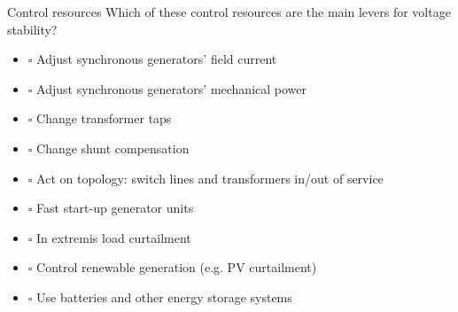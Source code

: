 \begin{frame}{Control resources}
    Which of these control resources are the main levers for voltage stability?
      \begin{itemize}
          \item $\square$ Adjust synchronous generators' field current %
          \item $\square$ Adjust synchronous generators' mechanical power 
          \item $\square$ Change transformer taps %
          \item $\square$ Change shunt compensation %
          \item $\square$ Act on topology: switch lines and transformers in/out of service %
          \item $\square$ Fast start-up generator units %
          \item $\square$ In extremis load curtailment %
          \item $\square$ Control renewable generation (e.g. PV curtailment) %
          \item $\square$ Use batteries and other energy storage systems %
      \end{itemize}
\end{frame}

